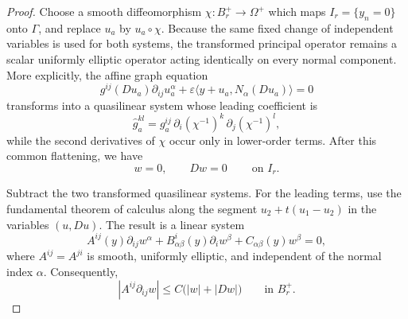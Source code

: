 \documentclass[11pt,a4paper]{article}
\numberwithin{equation}{section}
\begin{document}
\begin{proof}
Choose a smooth diffeomorphism
$\chi:B_r^+\to\Omega^+$ which maps $I_r=\{y_n=0\}$ onto $\Gamma$, and replace
$u_a$ by $u_a\circ\chi$.  Because the same fixed change of independent
variables is used for both systems, the transformed principal operator remains
a scalar uniformly elliptic operator acting identically on every normal
component.  More explicitly, the affine graph equation
\begin{equation*}
        g^{ij}(Du_a)\partial_{ij}u_a^\alpha
        +\varepsilon\langle y+u_a,N_\alpha(Du_a)\rangle=0
\end{equation*}
transforms into a quasilinear system whose leading coefficient is
\begin{equation*}
        \widehat g_a^{kl}
        =g_a^{ij}\,\partial_i(\chi^{-1})^k\,\partial_j(\chi^{-1})^l,
\end{equation*}
while the second derivatives of $\chi$ occur only in lower-order terms.
After this common flattening, we have
\begin{equation}\label{eq:full-cauchy-data}
        w=0,
        \qquad
        Dw=0
        \qquad\ \text{on }I_r.
\end{equation}

Subtract the two transformed quasilinear systems.  For the leading terms,
use the fundamental theorem of calculus along the segment
$u_2+t(u_1-u_2)$ in the variables $(u,Du)$.  The result is a linear system
\begin{equation}
        A^{ij}(y)\partial_{ij}w^\alpha
        +B^i_{\alpha\beta}(y)\partial_iw^\beta
        +C_{\alpha\beta}(y)w^\beta=0,
\end{equation}
where $A^{ij}=A^{ji}$ is smooth, uniformly elliptic, and independent of the
normal index $\alpha$.  Consequently,
\begin{equation}
        |A^{ij}\partial_{ij}w|
        \le C\bigl(|w|+|Dw|\bigr)
        \qquad\text{in }B_r^+.
\end{equation}


\end{proof}
\end{document}
